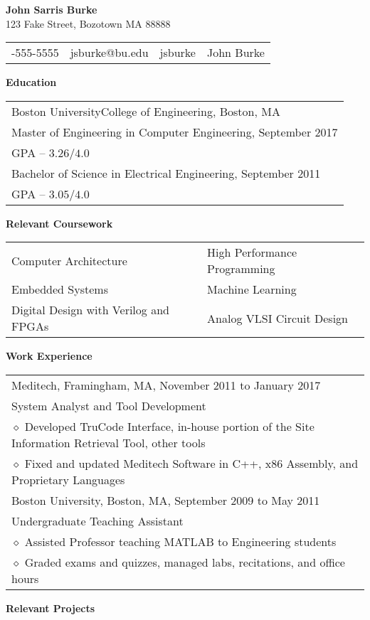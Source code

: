 \documentclass[11pt,letterpaper]{article}
\makeatletter
\newcommand{\pseudoitem}{\diamond}
\newcommand{\vertspace}{\vspace{2mm}}
\newcommand{\horzindent}{\hspace{3mm}}
\newcommand{\minoritem}{\hspace{4.5mm} $\pseudoitem$ }
\newcommand{\name}{John Sarris Burke}
\newcommand{\address}{123 Fake Street, Bozotown MA 88888}
\newcommand{\phone}{555-555-5555}
\newcommand{\email}{jsburke@bu.edu}
\newcommand{\github}{jsburke}
\newcommand{\linkedin}{John Burke}
\newcommand{\undergrad}{Boston University}
\newcommand{\undergradmajor}{Electrical Engineering}
\newcommand{\undergradend}{September 2011}
\newcommand{\grad}{Boston University}
\newcommand{\gradschool}{College of Engineering}
\newcommand{\gradmajor}{Computer Engineering}
\newcommand{\gradend}{September 2017}
\newlength\myheight
\newlength\mydepth
\newcommand*\inlineicon[1]{%
  \settototalheight\myheight{Xygp}%
  \settodepth\mydepth{Xygp}%
  \raisebox{-\mydepth}{\texttt{[image: \#1]}}%
}
\newcommand{\iconemail}{\inlineicon{email-icon-2048}\space}
\newcommand{\icongithub}{\inlineicon{GitHub-Mark-120px-plus}\space}
\newcommand{\iconphone}{\inlineicon{phone-icon-black}\space}
\newcommand{\iconlinkedin}{\inlineicon{linkedin-icon-black}\space}
\makeatother
\begin{document}
	
	\begin{center}	
		\textbf{\large \name}\\
		\address\\
		\begin{tabular}{c||c||c||c}
			\iconphone \phone & \iconemail \email & \icongithub \github & \iconlinkedin \linkedin \\
		\end{tabular}
	\end{center}

	\noindent
	\textbf{Education} \\
		\begin{tabular}{l}
			\grad\space\gradschool , Boston, MA \\
			Master of Engineering in \gradmajor , \gradend \\
			GPA -- $3.26 / 4.0$ \\
			Bachelor of Science in \undergradmajor , \undergradend \\
			GPA -- $3.05 / 4.0$ \\
		\end{tabular}
	
	\vertspace
	\noindent	
	\textbf{Relevant Coursework}	 \\
		\begin{tabular}{ll}
			Computer Architecture & High Performance Programming \\
			Embedded Systems      & Machine Learning \\
			Digital Design with Verilog and FPGAs & Analog VLSI Circuit Design \\
		\end{tabular}
		
	\vertspace
	\noindent
	\textbf{Work Experience} \\
		\begin{tabular}{l}
			Meditech, Framingham, MA, November 2011 to January 2017\\
			\horzindent System Analyst and Tool Development \\
			\minoritem Developed TruCode Interface, in-house portion of the Site Information Retrieval Tool, other tools \\
			\minoritem Fixed and updated Meditech Software in C++, x86 Assembly, and Proprietary Languages \\
			\undergrad , Boston, MA, September 2009 to May 2011 \\
			\horzindent Undergraduate Teaching Assistant \\
			\minoritem Assisted Professor teaching MATLAB to Engineering students \\
			\minoritem Graded exams and quizzes, managed labs, recitations, and office hours \\
		\end{tabular}
		
	\vertspace
	\noindent
	\textbf{Relevant Projects}
\end{document}
